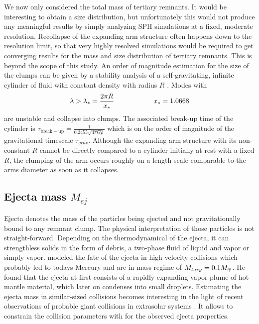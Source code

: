 We now only considered the total mass of tertiary remnants. It would be interesting to obtain a size distribution, but unfortunately this would not produce any meaningful results by simply analyzing SPH simulations at a fixed, moderate resolution. Recollapse of the expanding arm structure often happens down to the resolution limit, so that very highly resolved simulations would be required to get converging results for the mass and size distribution of tertiary remnants. This is beyond the scope of this study. An order of magnitude estimation for the size of the clumps can be given by a stability analysis of a self-gravitating, infinite cylinder of fluid with constant density with radius $R$ \citep{1961Chandrasekhar.C}. Modes with
\begin{align}
\lambda > \lambda_{*} = \frac{2 \pi R}{x_*} \hspace{2.0cm} x_* = 1.0668
\end{align} 
are unstable and collapse into clumps. The associated break-up time of the cylinder is $\tau_{\mathrm{break-up}} = \frac{1}{0.2455 \sqrt{4 \pi G \rho} }$ which is on the order of magnitude of the gravitational timescale $\tau_{grav}$. Although the expanding arm structure with its non-constant $R$ cannot be directly compared to a cylinder initially at rest with a fixed $R$, the clumping of the arm occurs roughly on a length-scale comparable to the arms diameter as soon as it collapses.

\subsection{Ejecta mass $M_{ej}$}
Ejecta denotes the mass of the particles being ejected and not gravitationally bound to any remnant clump. The physical interpretation of those particles is not straight-forward. Depending on the thermodynamical of the ejecta, it can strengthless solids in the form of debris, a two-phase fluid of liquid and vapor or simply vapor. \cite{Anic:2006p99} modeled the fate of the ejecta in high velocity collisions which probably led to todays Mercury and are in mass regime of $M_{targ} = 0.1 M_{\oplus}$. He found that the ejecta at first consists of a rapidly expanding vapor plume of hot mantle material, which later on condenses into small droplets. Estimating the ejecta mass in similar-sized collisions becomes interesting in the light of recent observations of probable giant collisions in extrasolar systems \citep{Lisse:2009p3131}. It allows to constrain the collision parameters with for the observed ejecta properties.

